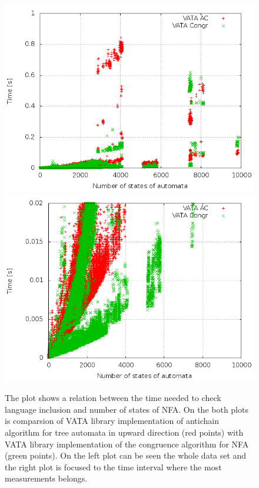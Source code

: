 \begin{figure}
\begin{center}
\includegraphics[scale=0.3]{fig/plot_ac_zprava.png}
\includegraphics[scale=0.3]{fig/plot_ac_step_zprava.png}
\label{figPlotAc}
\caption{The plot shows a relation between the time needed to check language inclusion and number of states of NFA. On the both plots
  is comparsion of VATA library implementation of antichain algorithm for tree automata in upward direction (red points) 
    with VATA library implementation of the congruence
    algorithm for NFA (green points). On the left plot can be seen the whole data set and the right plot is focused to the time interval
    where the most measurements belongs.}
\end{center}
\end{figure}


